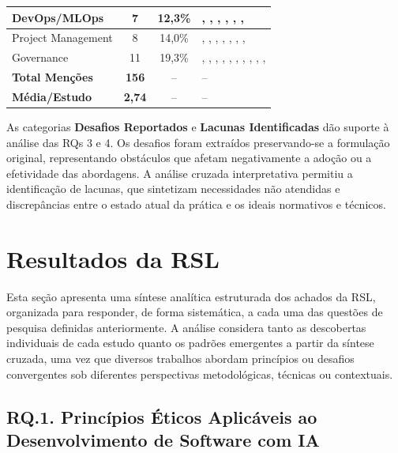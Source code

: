 \begin{table}[htbp]
\begin{tabular}{lccp{6.5cm}}
\hline
DevOps/MLOps                   &  7 & 12,3\% & \cite{S008}, \cite{S021}, \cite{S038}, \cite{S040}, \cite{S044}, \cite{S045}, \cite{S057} \\
\hline
Project Management             &  8 & 14,0\% & \cite{S011}, \cite{S022}, \cite{S025}, \cite{S028}, \cite{S035}, \cite{S038}, \cite{S042}, \cite{S046} \\
\hline
Governance                     & 11 & 19,3\% & \cite{S014}, \cite{S016}, \cite{S028}, \cite{S038}, \cite{S039}, \cite{S041}, \cite{S046}, \cite{S049}, \cite{S053}, \cite{S054}, \cite{S055} \\
\hline
\textbf{Total Menções} & \textbf{156} & -- & -- \\
\textbf{Média/Estudo} & \textbf{2,74} & -- & -- \\
\hline
\end{tabular}
\end{table}

As categorias \textbf{Desafios Reportados} e \textbf{Lacunas Identificadas} dão suporte à análise das RQs 3 e 4. Os desafios foram extraídos preservando-se a formulação original, representando obstáculos que afetam negativamente a adoção ou a efetividade das abordagens. A análise cruzada interpretativa permitiu a identificação de lacunas, que sintetizam necessidades não atendidas e discrepâncias entre o estado atual da prática e os ideais normativos e técnicos.


\section{Resultados da RSL}

Esta seção apresenta uma síntese analítica estruturada dos achados da \acrshort{RSL}, organizada para responder, de forma sistemática, a cada uma das questões de pesquisa definidas anteriormente. A análise considera tanto as descobertas individuais de cada estudo quanto os padrões emergentes a partir da síntese cruzada, uma vez que diversos trabalhos abordam princípios ou desafios convergentes sob diferentes perspectivas metodológicas, técnicas ou contextuais.


\subsection{RQ.1. Princípios Éticos Aplicáveis ao Desenvolvimento de Software com IA}

